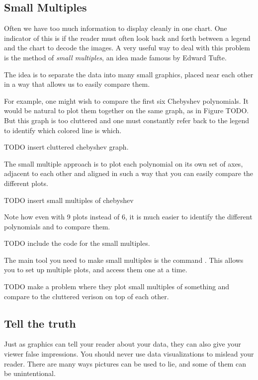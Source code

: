 \subsection*{Small Multiples}

Often we have too much information to display cleanly in one chart.  One indicator of this is if the reader must often look back and forth between a legend and the chart to decode the images.  A very useful way to deal with this problem is the method of \emph{small multiples}, an idea made famous by Edward Tufte.

The idea is to separate the data into many small graphics, placed near each other in a way that allows us to easily compare them.

For example, one might wish to compare the first six Chebyshev polynomials.  It would be natural to plot them together on the same graph, as in Figure TODO.  But this graph is too cluttered and one must constantly refer back to the legend to identify which colored line is which.

TODO insert cluttered chebyshev graph.

The small multiple approach is to plot each polynomial on its own set of axes, adjacent to each other and aligned in such a way that you can easily compare the different plots. 

TODO insert small multiples of chebyshev

Note how even with 9 plots instead of 6, it is much easier to identify the different polynomials and to compare them.


TODO include the code for the small multiples.

The main tool you need to make small multiples is the command .  This allows you to set up multiple plots, and access them one at a time.


\begin{problem}

TODO make a problem where they plot small multiples of something and compare to the cluttered verison on top of each other.

\end{problem}

\subsection*{Tell the truth}

Just as graphics can tell your reader about your data, they can also give your viewer false impressions. 
You should never use data visualizations to mislead your reader. 
There are many ways pictures can be used to lie, and some of them can be unintentional.

